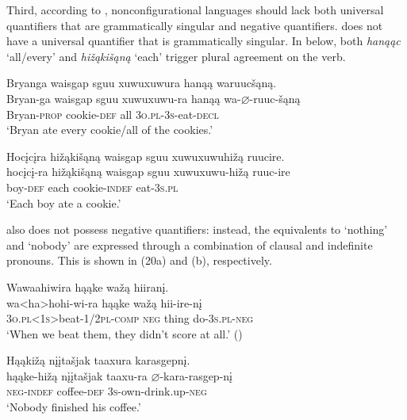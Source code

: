 \documentclass[output=paper]{LSP/langsci}
\begin{document}
Third, according to \citet{Baker1996}, nonconfigurational languages should lack both universal quantifiers that are grammatically singular and negative quantifiers.  does not have a universal quantifier that is grammatically singular.  In  below, both \textit{hanąąc} `all/every' and \textit{hi\v{z}ąki\v{s}ąną} `each' trigger plural agreement on the verb.

\begin{exe}
\ex\label{ex:jrs:19}	
\begin{xlist}	
\ex
\glll Bryanga {waisgap sguu xuwuxuwura} 	hanąą 	waruuc\v{s}ąną.\\
Bryan-ga 	{waisgap sguu xuwuxuwu-ra} 	hanąą 	wa-$\varnothing$-ruuc-\v{s}ąną \\
	Bryan-\textsc{prop} 	cookie-\textsc{def}	all 		\textsc{3o.pl-3s}-eat-\textsc{decl} \\
\trans `Bryan ate every cookie/all of the cookies.'

\ex
\glll Hoc\k{i}c\k{i}ra 	hi\v{z}ąki\v{s}ąną 	{waisgap sguu xuwuxuwuhi\v{z}ą }		ruucire.\\
hoc\k{i}c\k{i}-ra 	hi\v{z}ąki\v{s}ąną 	{waisgap sguu xuwuxuwu-hi\v{z}ą }		ruuc-ire \\
	boy-\textsc{def} 		each 					cookie-\textsc{indef}		eat-\textsc{3s.pl}\\
\trans `Each boy ate a cookie.'
\end{xlist}
\end{exe}

 also does not possess negative quantifiers: instead, the equivalents to `nothing' and `nobody' are expressed through a combination of clausal  and indefinite pronouns. This is shown in (20a) and (b), respectively.

\begin{exe}
\ex\label{ex:jrs:20}
\begin{xlist} 	
\ex
\glll Wawaahiwira 	hąąke 	wa\v{z}ą 	hiiran\k{i}. \\
wa<ha>hohi-wi-ra 						hąąke 	wa\v{z}ą 	hii-ire-n\k{i} \\
	\textsc{3o.pl<1s>}beat-\textsc{1/2pl}-\textsc{comp} \textsc{neg}		thing 	do-\textsc{3s.pl-neg} \\
\trans `When we beat them, they didn't score at all.' (\citealt{Hartmann2012}) 

\ex
\glll Hąąki\v{z}ą 	{n\k{i}\k{i}ta\v{s}jak taaxura} 	karasgepn\k{i}. \\
hąąke-hi\v{z}ą  {n\k{i}\k{i}ta\v{s}jak taaxu-ra }	$\varnothing$-kara-rasgep-n\k{i} \\
	\textsc{neg-indef} 	coffee-\textsc{def}	\textsc{3s}-own-drink.up-\textsc{neg} \\
\trans `Nobody finished his coffee.'
\end{xlist}
\end{exe}
	
\end{document}
